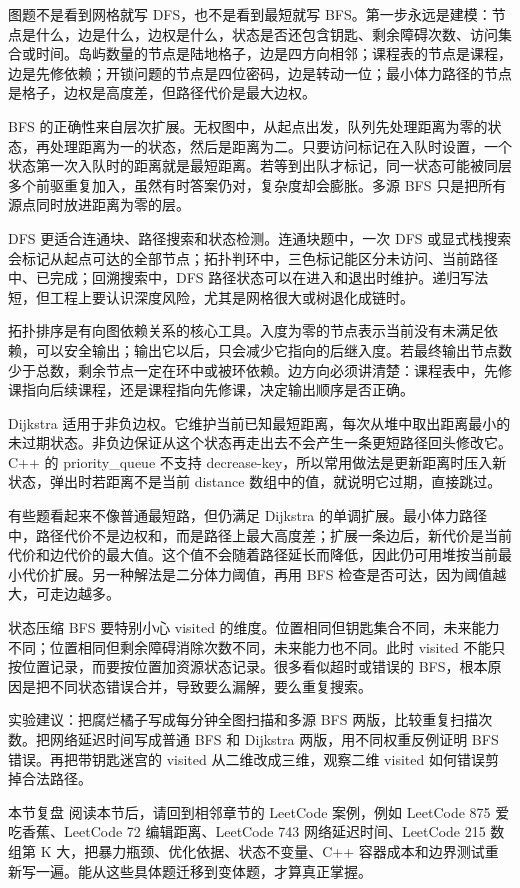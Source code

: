 
图题不是看到网格就写 DFS，也不是看到最短就写 BFS。第一步永远是建模：节点是什么，边是什么，边权是什么，状态是否还包含钥匙、剩余障碍次数、访问集合或时间。岛屿数量的节点是陆地格子，边是四方向相邻；课程表的节点是课程，边是先修依赖；开锁问题的节点是四位密码，边是转动一位；最小体力路径的节点是格子，边权是高度差，但路径代价是最大边权。

BFS 的正确性来自层次扩展。无权图中，从起点出发，队列先处理距离为零的状态，再处理距离为一的状态，然后是距离为二。只要访问标记在入队时设置，一个状态第一次入队时的距离就是最短距离。若等到出队才标记，同一状态可能被同层多个前驱重复加入，虽然有时答案仍对，复杂度却会膨胀。多源 BFS 只是把所有源点同时放进距离为零的层。

DFS 更适合连通块、路径搜索和状态检测。连通块题中，一次 DFS 或显式栈搜索会标记从起点可达的全部节点；拓扑判环中，三色标记能区分未访问、当前路径中、已完成；回溯搜索中，DFS 路径状态可以在进入和退出时维护。递归写法短，但工程上要认识深度风险，尤其是网格很大或树退化成链时。

拓扑排序是有向图依赖关系的核心工具。入度为零的节点表示当前没有未满足依赖，可以安全输出；输出它以后，只会减少它指向的后继入度。若最终输出节点数少于总数，剩余节点一定在环中或被环依赖。边方向必须讲清楚：课程表中，先修课指向后续课程，还是课程指向先修课，决定输出顺序是否正确。

Dijkstra 适用于非负边权。它维护当前已知最短距离，每次从堆中取出距离最小的未过期状态。非负边保证从这个状态再走出去不会产生一条更短路径回头修改它。C++ 的 priority\_queue 不支持 decrease-key，所以常用做法是更新距离时压入新状态，弹出时若距离不是当前 distance 数组中的值，就说明它过期，直接跳过。

有些题看起来不像普通最短路，但仍满足 Dijkstra 的单调扩展。最小体力路径中，路径代价不是边权和，而是路径上最大高度差；扩展一条边后，新代价是当前代价和边代价的最大值。这个值不会随着路径延长而降低，因此仍可用堆按当前最小代价扩展。另一种解法是二分体力阈值，再用 BFS 检查是否可达，因为阈值越大，可走边越多。

状态压缩 BFS 要特别小心 visited 的维度。位置相同但钥匙集合不同，未来能力不同；位置相同但剩余障碍消除次数不同，未来能力也不同。此时 visited 不能只按位置记录，而要按位置加资源状态记录。很多看似超时或错误的 BFS，根本原因是把不同状态错误合并，导致要么漏解，要么重复搜索。

实验建议：把腐烂橘子写成每分钟全图扫描和多源 BFS 两版，比较重复扫描次数。把网络延迟时间写成普通 BFS 和 Dijkstra 两版，用不同权重反例证明 BFS 错误。再把带钥匙迷宫的 visited 从二维改成三维，观察二维 visited 如何错误剪掉合法路径。

\begin{principlebox}{本节复盘}
阅读本节后，请回到相邻章节的 LeetCode 案例，例如 LeetCode 875 爱吃香蕉、LeetCode 72 编辑距离、LeetCode 743 网络延迟时间、LeetCode 215 数组第 K 大，把暴力瓶颈、优化依据、状态不变量、C++ 容器成本和边界测试重新写一遍。能从这些具体题迁移到变体题，才算真正掌握。
\end{principlebox}
